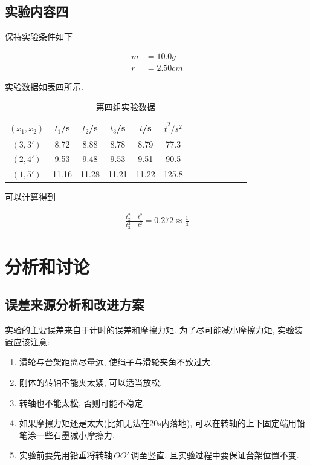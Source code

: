 \documentclass[a4paper,12pt,notitlepage]{article}
\begin{document}
\subsection{实验内容四}

	保持实验条件如下
	
\begin{align*}
	m &= 10.0g \\
	r &= 2.50 cm
\end{align*}

	实验数据如表四所示. \\

\begin{center}
	\begin{longtable}{|c|c|c|c|c|c|c|c|c|c|c|c|c|}

	\caption{第四组实验数据}	\\
	\hline
	$(x_1, x_2)$ & $t_1$/s & $t_2$/s & $t_3$/s & $\bar{t}$/s & $\bar{t}^2/s^2$ \\
	\hline
	$(3, 3')$ & 8.72 & 8.88 & 8.78 & 8.79 & 77.3 \\
	\hline
	$(2, 4')$ & 9.53 & 9.48 & 9.53 & 9.51 & 90.5 \\
	\hline
	$(1, 5')$ & 11.16 & 11.28 & 11.21 & 11.22 & 125.8 \\
	\hline

	\end{longtable}
\end{center}

	可以计算得到
	
\begin{align*}
	\frac{t_2^2 - t_1^2}{t_3^2 - t_1^2} = 0.272 \approx \frac{1}{4}
\end{align*}

\section{分析和讨论}

\subsection{误差来源分析和改进方案}

	实验的主要误差来自于计时的误差和摩擦力矩. 为了尽可能减小摩擦力矩, 实验装置应该注意:
	
\begin{enumerate}
	\item 滑轮与台架距离尽量远, 使绳子与滑轮夹角不致过大.
	\item 刚体的转轴不能夹太紧, 可以适当放松.
	\item 转轴也不能太松, 否则可能不稳定.
	\item 如果摩擦力矩还是太大(比如无法在20s内落地), 可以在转轴的上下固定端用铅笔涂一些石墨减小摩擦力.
	\item 实验前要先用铅垂将转轴$\,OO'\,$调至竖直, 且实验过程中要保证台架位置不变.
\end{enumerate}
\end{document}
